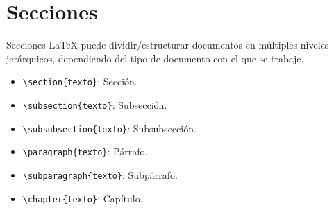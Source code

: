 \documentclass[12pt]{beamer}
\begin{document}
\section{Secciones}
\begin{frame}{Secciones}
  LaTeX puede dividir/estructurar documentos en múltiples niveles jerárquicos, dependiendo del tipo de documento con el que se trabaje.
  \begin{itemize}
    \item<1-> {\color{blue}\texttt{\textbackslash section\{texto\}}}: Secci\'on.
    \item<2-> {\color{blue}\texttt{\textbackslash subsection\{texto\}}}: Subsecci\'on.
    \item<3-> {\color{blue}\texttt{\textbackslash subsubsection\{texto\}}}: Subsubsecci\'on.
    \item <4-> {\color{blue}\texttt{\textbackslash paragraph\{texto\}}}: Párrafo.
    \item <5-> {\color{blue}\texttt{\textbackslash subparagraph\{texto\}}}: Subpárrafo.
    \item <6-> {\color{blue}\texttt{\textbackslash chapter\{texto\}}}: Cap\'itulo.
  \end{itemize}
\end{frame}
\end{document}
